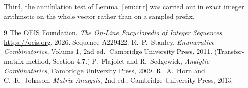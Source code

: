 \documentclass[11pt,a4paper]{article}
\theoremstyle{plain}
\theoremstyle{definition}
\begin{document}
Third, the annihilation test of Lemma~\ref{lem:crit} was carried out in exact integer
arithmetic on the whole vector rather than on a sampled prefix.

\begin{thebibliography}{9}
 The OEIS Foundation, \emph{The On-Line Encyclopedia of Integer
Sequences}, \url{https://oeis.org}, 2026. Sequence A229422.
 R.~P.~Stanley, \emph{Enumerative Combinatorics}, Volume 1, 2nd ed.,
Cambridge University Press, 2011. (Transfer-matrix method, Section 4.7.)
 P.~Flajolet and R.~Sedgewick, \emph{Analytic Combinatorics}, Cambridge
University Press, 2009.
 R.~A.~Horn and C.~R.~Johnson, \emph{Matrix Analysis}, 2nd ed., Cambridge
University Press, 2013.
\end{thebibliography}
\end{document}
